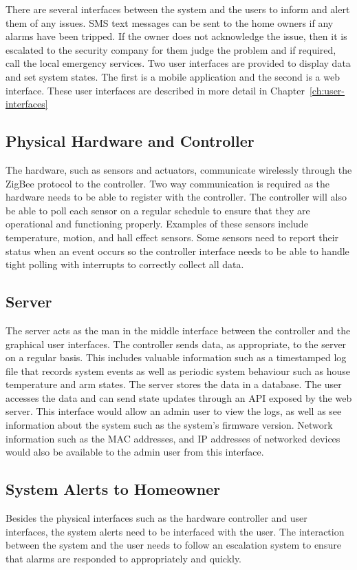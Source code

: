 \documentclass{report}
\begin{document}
There are several interfaces between the system and the users to inform and
alert them of any issues. SMS text messages can be sent to the home owners if
any alarms have been tripped. If the owner does not acknowledge the issue, then
it is escalated to the security company for them judge the problem and if required,
call the local emergency services. Two user interfaces are provided to display
data and set system states. The first is a mobile application and the second is
a web interface. These user interfaces are described in more detail in
Chapter~\ref{ch:user-interfaces}

\subsection{Physical Hardware and Controller}
The hardware, such as sensors and actuators, communicate wirelessly through the
ZigBee protocol to the controller. Two way communication is required as the
hardware needs to be able to register with the controller. The controller will
also be able to poll each sensor on a regular schedule to ensure that they are
operational and functioning properly. Examples of these sensors include
temperature, motion, and hall effect sensors. Some sensors need to report their
status when an event occurs so the controller interface needs to be able to
handle tight polling with interrupts to correctly collect all data.

\subsection{Server}
The server acts as the man in the middle interface between the controller and
the graphical user interfaces. The controller sends data, as appropriate, to
the server on a regular basis. This includes valuable information such as
a timestamped log file that records system events as well as periodic system
behaviour such as house temperature and arm states. The server stores the data in a 
database. The user accesses the data and can send state updates through an API 
exposed by the web server. This interface would allow an admin user to view the
logs, as well as see information about the system such as the system's firmware 
version. Network information such as the MAC addresses, and IP addresses of 
networked devices would also be available to the admin user from this interface.

\subsection{System Alerts to Homeowner}
Besides the physical interfaces such as the hardware controller and user
interfaces, the system alerts need to be interfaced with the user. The
interaction between the system and the user needs to follow an escalation
system to ensure that alarms are responded to appropriately and quickly.
\end{document}
